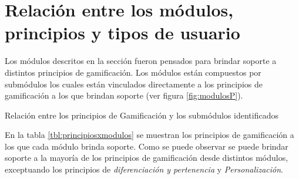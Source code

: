 
\section{Relación entre los módulos, principios y tipos de usuario}
\label{analisis:principios}

 Los módulos descritos en la sección  fueron pensados para 
 brindar soporte a distintos principios de gamificación. Los módulos están compuestos
 por submódulos los cuales están vinculados directamente a los principios de
 gamificación a los que brindan soporte (ver figura \ref{fig:modulosP}).

    {Relación entre los principios de Gamificación y los submódulos identificados}

 \clearpage
 \noindent 
 En la tabla \ref{tbl:principiosxmodulos} se muestran los principios de gamificación
 a los que cada módulo brinda soporte. Como se puede observar se puede brindar
 soporte a la mayoría de los principios de gamificación desde distintos módulos,
 exceptuando los principios de {\it diferenciación y pertenencia} y
 {\it Personalización}.


